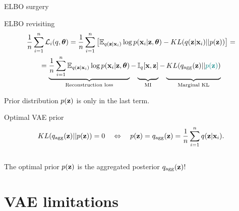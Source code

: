 \begin{frame}{ELBO surgery}
	\begin{block}{ELBO revisiting}
		\vspace{-0.7cm}
		\begin{multline*}
		    \frac{1}{n}\sum_{i=1}^n \cL_i(q, \btheta) = \frac{1}{n} \sum_{i=1}^n \left[ \mathbb{E}_{q(\bz | \bx_i)} \log p(\bx_i | \bz, \btheta) - KL(q(\bz | \bx_i) || p(\bz)) \right] = \\
		    = \underbrace{\frac{1}{n} \sum_{i=1}^n \mathbb{E}_{q(\bz | \bx_i)} \log p(\bx_i | \bz, \btheta)}_{\text{Reconstruction loss}} - \underbrace{\vphantom{ \sum_{i=1}^n} \bbI_q [\bx, \bz]}_{\text{MI}} - \underbrace{\vphantom{ \sum_{i=1}^n} KL(q_{\text{agg}}(\bz) || {\color{teal}p(\bz)})}_{\text{Marginal KL}}
		\end{multline*}
		\vspace{-0.3cm}
	\end{block}
	Prior distribution $p(\mathbf{z})$ is only in the last term.
	\begin{block}{Optimal VAE prior}
		\vspace{-0.7cm}
		\[
	  		KL(q_{\text{agg}}(\mathbf{z}) || p(\mathbf{z})) = 0 \quad \Leftrightarrow \quad p (\mathbf{z}) = q_{\text{agg}}(\mathbf{z}) = \frac{1}{n} \sum_{i=1}^n q(\mathbf{z} | \mathbf{x}_i).
		\]
		\vspace{-0.4cm} \\
		The optimal prior $p(\mathbf{z})$ is the aggregated posterior $q_{\text{agg}}(\mathbf{z})$!
	\end{block}
	
\end{frame}
\section{VAE limitations}
